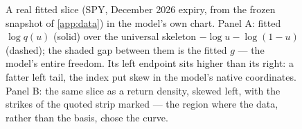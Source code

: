 \begin{figure}[htbp]
\centering
{}
\caption{A real fitted slice (SPY, December 2026 expiry, from the frozen
snapshot of \cref{app:data}) in the model's own chart.  Panel A: fitted
$\log q(u)$ (solid) over the universal skeleton $-\log u-\log(1-u)$
(dashed); the shaded gap between them is the fitted $g$ --- the model's
entire freedom.  Its left endpoint sits higher than its right: a fatter
left tail, the index put skew in the model's native coordinates.  Panel B:
the same slice as a return density, skewed left, with the strikes of the
quoted strip marked --- the region where the data, rather than the basis,
chose the curve.}
\label{fig:lqdchart}
\end{figure}
